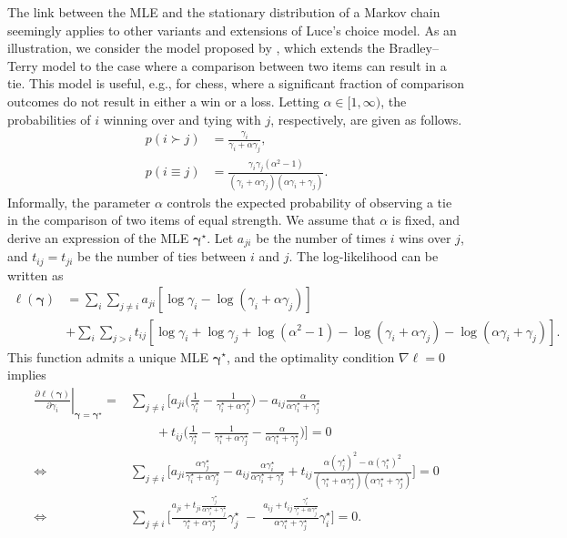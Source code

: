 The link between the MLE and the stationary distribution of a Markov chain seemingly applies to other variants and extensions of Luce's choice model.
As an illustration, we consider the model proposed by \citet{rao1967ties}, which extends the Bradley--Terry model to the case where a comparison between two items can result in a tie.
This model is useful, e.g., for chess, where a significant fraction of comparison outcomes do not result in either a win or a loss.
Letting $\alpha \in [1, \infty)$, the probabilities of $i$ winning over and tying with $j$, respectively, are given as follows.
\begin{align*}
p(i \succ j) &= \frac{\gamma_i}{\gamma_i + \alpha \gamma_j}, \\
p(i \equiv j) &= \frac{\gamma_i \gamma_j(\alpha^2 - 1)}{(\gamma_i + \alpha\gamma_j)(\alpha \gamma_i + \gamma_j)}.
\end{align*}
Informally, the parameter $\alpha$ controls the expected probability of observing a tie in the comparison of two items of equal strength.
We assume that $\alpha$ is fixed, and derive an expression of the MLE $\bm{\gamma}^\star$.
Let $a_{ji}$ be the number of times $i$ wins over $j$, and $t_{ij} = t_{ji}$ be the number of ties between $i$ and $j$.
The log-likelihood can be written as
\begin{align*}
\ell(\bm{\gamma}) &=
  \sum_i \sum_{j \ne i}
  a_{ji} \left[ \log \gamma_i - \log(\gamma_i + \alpha \gamma_j) \right] \\
    &+ \sum_i \sum_{j > i}
    t_{ij} \left[ \log \gamma_i + \log \gamma_j  + \log(\alpha^2 - 1)
     - \log(\gamma_i + \alpha \gamma_j) - \log(\alpha \gamma_i + \gamma_j) \right].
\end{align*}
This function admits a unique MLE $\bm{\gamma}^\star$, and the optimality condition $\nabla \ell = 0$ implies
\begin{align*}
\left. \frac{\partial \ell(\bm{\gamma})}{\partial \gamma_i} \right\rvert_{\bm{\gamma}= \bm{\gamma}^\star}
    = &\sum_{j \ne i} \Bigg[ a_{ji} \bigg( \frac{1}{\gamma^\star_i} - \frac{1}{\gamma^\star_i + \alpha \gamma^\star_j} \bigg)
      - a_{ij} \frac{\alpha}{\alpha \gamma^\star_i + \gamma^\star_j} \\
      & \qquad {} + t_{ij} \bigg( \frac{1}{\gamma^\star_i} - \frac{1}{\gamma^\star_i + \alpha \gamma^\star_j} - \frac{\alpha}{\alpha \gamma^\star_i + \gamma^\star_j} \bigg) \Bigg] = 0 \\
    \iff & \sum_{j \ne i} \Bigg[ a_{ji} \frac{\alpha \gamma^\star_j}{\gamma^\star_i + \alpha \gamma^\star_j}
      - a_{ij} \frac{\alpha \gamma^\star_i}{\alpha \gamma^\star_i + \gamma^\star_j}
      + t_{ij} \frac{\alpha (\gamma^\star_j)^2 - \alpha (\gamma^\star_i)^2}{(\gamma^\star_i + \alpha \gamma^\star_j)(\alpha \gamma^\star_i + \gamma^\star_j)} \Bigg] = 0 \\
    \iff & \sum_{j \ne i} \Bigg[ \frac{a_{ji} + t_{ji}\tfrac{\gamma^\star_j}{\alpha \gamma^\star_i + \gamma^\star_j}}{\gamma^\star_i + \alpha \gamma^\star_j} \gamma^\star_j
      \; - \; \frac{a_{ij} + t_{ij}\tfrac{\gamma^\star_i}{\gamma^\star_i + \alpha \gamma^\star_j}}{\alpha \gamma^\star_i + \gamma^\star_j} \gamma^\star_i \Bigg] = 0.
\end{align*}
